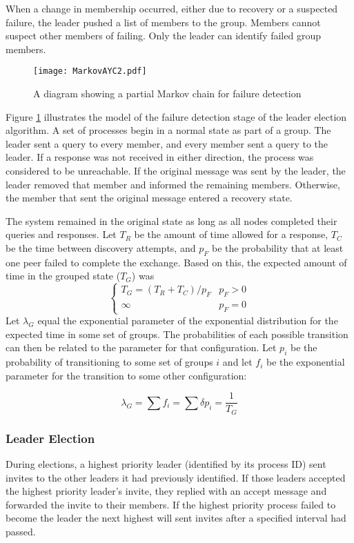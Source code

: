 When a change in membership occurred, either due to recovery or a suspected failure, the leader pushed a list of members to the group.
Members cannot suspect other members of failing.
Only the leader can identify failed group members.

\begin{figure}
\centering
\texttt{[image: MarkovAYC2.pdf]}
\caption{A diagram showing a partial Markov chain for failure detection}
\label{fig:MARKOVAYC}
\end{figure}

Figure \ref{fig:MARKOVAYC} illustrates the model of the failure detection stage of the leader election algorithm.
A set of processes begin in a normal state as part of a group.
The leader sent a query to every member, and every member sent a query to the leader.
If a response was not received in either direction, the process was considered to be unreachable.
If the original message was sent by the leader, the leader removed that member and informed the remaining members.
Otherwise, the member that sent the original message entered a recovery state.

The system remained in the original state as long as all nodes completed their queries and responses.
Let $T_{R}$ be the amount of time allowed for a response, $T_{C}$ be the time between discovery attempts, and $p_{F}$ be the probability that at least one peer failed to complete the exchange.
Based on this, the expected amount of time in the grouped state ($T_{G}$) was
\begin{equation}
\begin{cases}
T_{G} = ( T_{R}+T_{C}  ) / p_{F} & p_{F} > 0 \\
\infty & p_{F} = 0
\end{cases}
\end{equation}
Let $\lambda_{G}$ equal the exponential parameter of the exponential distribution for the expected time in some set of groups.
The probabilities of each possible transition can then be related to the parameter for that configuration.
Let $p_{i}$ be the probability of transitioning to some set of groups $i$ and let $f_{i}$ be the exponential parameter for the transition to some other configuration:

\begin{equation}
\lambda_{G} = \sum f_{i} = \sum \delta p_{i} = \frac{1}{T_{G}}
\end{equation}


\subsubsection{Leader Election}
During elections, a highest priority leader (identified by its process ID) sent invites to the other leaders it had previously identified.
If those leaders accepted the highest priority leader's invite, they replied with an accept message and forwarded the invite to their members.
If the highest priority process failed to become the leader the next highest will sent invites after a specified interval had passed.

